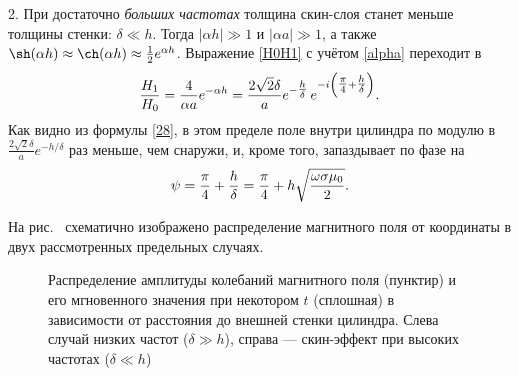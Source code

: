 2. При достаточно \emph{больших частотах} толщина скин-слоя станет меньше толщины стенки:
$\delta \ll h$. Тогда $|\alpha h| \gg 1$ и $|\alpha a| \gg 1$, а
также $\sh(\alpha h)\approx\ch(\alpha h)\approx\frac12e^{\alpha h}$.
Выражение \eqref{H0H1} с учётом \eqref{alpha} переходит в
\begin{equation} \eqmark{28}
\frac{H_1}{H_0}= \frac{4}{\alpha a} e^{-\alpha h}
= \frac{2\sqrt{2}\delta}{a}e^{-\tfrac{h}{\delta}}\,e^{-i\left(\tfrac{\pi}{4}+\tfrac{h}{\delta}\right)}.
\end{equation}
Как видно из формулы \eqref{28}, в этом пределе поле внутри цилиндра по модулю в
$\frac{2\sqrt{2}\delta}{a}e^{-h/\delta}$ раз меньше, чем снаружи, и,
кроме того, запаздывает по фазе на
\begin{equation} \eqmark{29}
\psi=\frac{\pi}{4}+\frac{h}{\delta}=
\frac{\pi}{4}+h\sqrt{\frac{\omega\sigma\mu_0}{2}}.
\end{equation}

На рис.~ схематично изображено распределение магнитного 
поля от координаты в двух рассмотренных предельных случаях.

\begin{figure}
    \centering
    \par
    \caption{Распределение амплитуды колебаний магнитного поля (пунктир)
        и его мгновенного значения при некотором $t$ (сплошная) в зависимости 
        от расстояния до внешней стенки цилиндра. 
        Слева случай низких частот ($\delta \gg h$), справа --- скин-эффект
        при высоких частотах ($\delta \ll h$)}
\end{figure}





